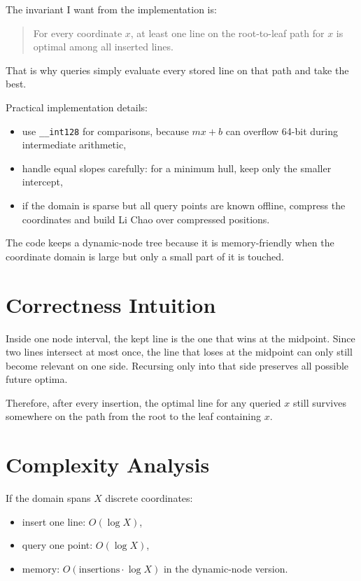 The invariant I want from the implementation is:

\begin{quote}
For every coordinate \(x\), at least one line on the root-to-leaf path for \(x\) is optimal among all inserted lines.
\end{quote}

That is why queries simply evaluate every stored line on that path and take the best.

Practical implementation details:

\begin{itemize}
  \item use \texttt{\_\_int128} for comparisons, because \(mx+b\) can overflow 64-bit during intermediate arithmetic,
  \item handle equal slopes carefully: for a minimum hull, keep only the smaller intercept,
  \item if the domain is sparse but all query points are known offline, compress the coordinates and build Li Chao over
  compressed positions.
\end{itemize}

The code keeps a dynamic-node tree because it is memory-friendly when the coordinate domain is large but only a small
part of it is touched.

\section*{Correctness Intuition}

Inside one node interval, the kept line is the one that wins at the midpoint. Since two lines intersect at most once,
the line that loses at the midpoint can only still become relevant on one side. Recursing only into that side preserves
all possible future optima.

Therefore, after every insertion, the optimal line for any queried \(x\) still survives somewhere on the path from the
root to the leaf containing \(x\).

\section*{Complexity Analysis}

If the domain spans \(X\) discrete coordinates:

\begin{itemize}
  \item insert one line: \(O(\log X)\),
  \item query one point: \(O(\log X)\),
  \item memory: \(O(\text{insertions} \cdot \log X)\) in the dynamic-node version.
\end{itemize}

